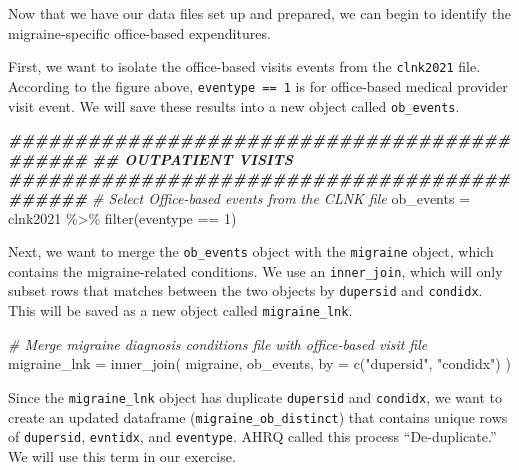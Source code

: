 \documentclass[
]{book}
\newenvironment{Shaded}{\begin{snugshade}}{\end{snugshade}}
\newcommand{\AttributeTok}[1]{\textcolor[rgb]{0.77,0.63,0.00}{#1}}
\newcommand{\CommentTok}[1]{\textcolor[rgb]{0.56,0.35,0.01}{\textit{#1}}}
\newcommand{\DecValTok}[1]{\textcolor[rgb]{0.00,0.00,0.81}{#1}}
\newcommand{\DocumentationTok}[1]{\textcolor[rgb]{0.56,0.35,0.01}{\textbf{\textit{#1}}}}
\newcommand{\FunctionTok}[1]{\textcolor[rgb]{0.00,0.00,0.00}{#1}}
\newcommand{\NormalTok}[1]{#1}
\newcommand{\OtherTok}[1]{\textcolor[rgb]{0.56,0.35,0.01}{#1}}
\newcommand{\SpecialCharTok}[1]{\textcolor[rgb]{0.00,0.00,0.00}{#1}}
\newcommand{\StringTok}[1]{\textcolor[rgb]{0.31,0.60,0.02}{#1}}
\begin{document}
Now that we have our data files set up and prepared, we can begin to identify the migraine-specific office-based expenditures.

First, we want to isolate the office-based visits events from the \texttt{clnk2021} file. According to the figure above, \texttt{eventype\ ==\ 1} is for office-based medical provider visit event. We will save these results into a new object called \texttt{ob\_events}.

\begin{Shaded}
\begin{Highlighting}[]
\DocumentationTok{\#\#\#\#\#\#\#\#\#\#\#\#\#\#\#\#\#\#\#\#\#\#\#\#\#\#\#\#\#\#\#\#\#\#\#\#\#\#\#\#\#\#\#\#}
\DocumentationTok{\#\# OUTPATIENT VISITS}
\DocumentationTok{\#\#\#\#\#\#\#\#\#\#\#\#\#\#\#\#\#\#\#\#\#\#\#\#\#\#\#\#\#\#\#\#\#\#\#\#\#\#\#\#\#\#\#\#}
\CommentTok{\# Select Office{-}based events from the CLNK file}
\NormalTok{ob\_events }\OtherTok{=}\NormalTok{ clnk2021 }\SpecialCharTok{\%\textgreater{}\%}
  \FunctionTok{filter}\NormalTok{(eventype }\SpecialCharTok{==} \DecValTok{1}\NormalTok{)}
\end{Highlighting}
\end{Shaded}

Next, we want to merge the \texttt{ob\_events} object with the \texttt{migraine} object, which contains the migraine-related conditions. We use an \texttt{inner\_join}, which will only subset rows that matches between the two objects by \texttt{dupersid} and \texttt{condidx}. This will be saved as a new object called \texttt{migraine\_lnk}.

\begin{Shaded}
\begin{Highlighting}[]
\CommentTok{\# Merge migraine diagnosis conditions file with office{-}based visit file}
\NormalTok{migraine\_lnk }\OtherTok{=} \FunctionTok{inner\_join}\NormalTok{(}
\NormalTok{  migraine, ob\_events,}
  \AttributeTok{by =} \FunctionTok{c}\NormalTok{(}\StringTok{"dupersid"}\NormalTok{, }\StringTok{"condidx"}\NormalTok{)}
\NormalTok{)}
\end{Highlighting}
\end{Shaded}

Since the \texttt{migraine\_lnk} object has duplicate \texttt{dupersid} and \texttt{condidx}, we want to create an updated dataframe (\texttt{migraine\_ob\_distinct}) that contains unique rows of \texttt{dupersid}, \texttt{evntidx}, and \texttt{eventype}. AHRQ called this process ``De-duplicate.'' We will use this term in our exercise.
\end{document}
